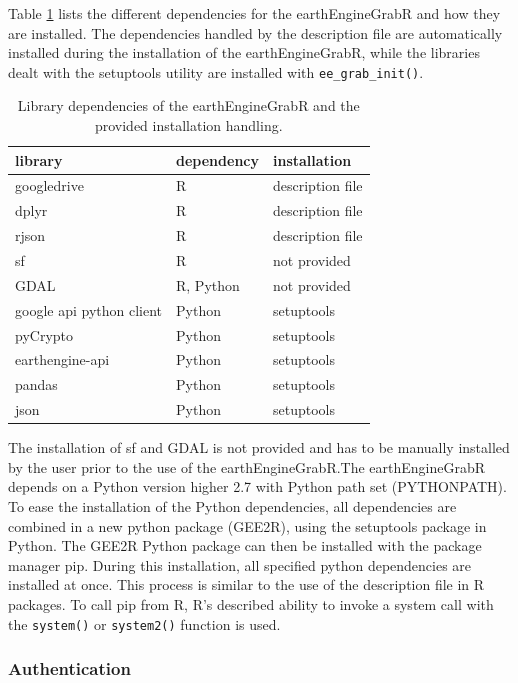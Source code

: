 Table \ref*{dependencies} lists the different dependencies for the earthEngineGrabR and how they are installed. 
The dependencies handled by the description file are automatically installed during the installation of the earthEngineGrabR, while the libraries dealt with the setuptools utility are installed with \texttt{ee\_grab\_init()}.
\begin{table}[h]
		\caption{Library dependencies of the earthEngineGrabR and the provided installation handling.}
	\begin{tabularx}{\textwidth}{XXl}
		\toprule
		\textbf{library} & \textbf{dependency} & \textbf{installation}  \\
		\midrule
		googledrive & R  & description file  \\
		dplyr & R  & description file  \\
		rjson & R  & description file  \\
		sf & R  & not provided  \\
		GDAL & R, Python  & not provided  \\
		google api python client & Python  & setuptools  \\
		pyCrypto & Python  & setuptools  \\
		earthengine-api & Python  & setuptools  \\        
		pandas & Python  & setuptools  \\        
		json & Python  & setuptools  \\        
		\bottomrule
	\end{tabularx}

	\label{dependencies}
\end{table}
 The installation of sf and GDAL is not provided and has to be manually installed by the user prior to the use of the earthEngineGrabR.The earthEngineGrabR depends on a Python version higher 2.7 with Python path set (PYTHONPATH). To ease the installation of the Python dependencies, all dependencies are combined in a new python package (GEE2R), using the setuptools package in Python. The GEE2R Python package can then be installed with the package manager pip. During this installation, all specified python dependencies are installed at once. This process is similar to the use of the description file in R packages. To call pip from R, R's described ability to invoke a system call with the \texttt{system()} or \texttt{system2()} function is used.

\subsubsection{Authentication}

